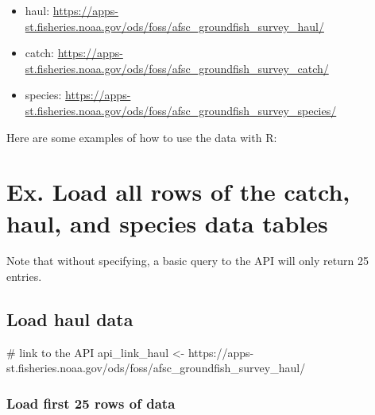\documentclass[
  letterpaper,
  oneside,
  open=any]{scrbook}
\newenvironment{Shaded}{\begin{snugshade}}{\end{snugshade}}
\newcommand{\AttributeTok}[1]{\textcolor[rgb]{0.40,0.45,0.13}{#1}}
\newcommand{\CommentTok}[1]{\textcolor[rgb]{0.37,0.37,0.37}{#1}}
\newcommand{\DocumentationTok}[1]{\textcolor[rgb]{0.37,0.37,0.37}{\textit{#1}}}
\newcommand{\FunctionTok}[1]{\textcolor[rgb]{0.28,0.35,0.67}{#1}}
\newcommand{\NormalTok}[1]{\textcolor[rgb]{0.00,0.23,0.31}{#1}}
\newcommand{\OtherTok}[1]{\textcolor[rgb]{0.00,0.23,0.31}{#1}}
\newcommand{\SpecialCharTok}[1]{\textcolor[rgb]{0.37,0.37,0.37}{#1}}
\newcommand{\StringTok}[1]{\textcolor[rgb]{0.13,0.47,0.30}{#1}}
\providecommand{\tightlist}{%
  \setlength{\itemsep}{0pt}\setlength{\parskip}{0pt}}\usepackage{longtable,booktabs,array}
\begin{document}
\begin{itemize}
\tightlist
\item
  haul:
  \url{https://apps-st.fisheries.noaa.gov/ods/foss/afsc_groundfish_survey_haul/}
\item
  catch:
  \url{https://apps-st.fisheries.noaa.gov/ods/foss/afsc_groundfish_survey_catch/}
\item
  species:
  \url{https://apps-st.fisheries.noaa.gov/ods/foss/afsc_groundfish_survey_species/}
\end{itemize}

Here are some examples of how to use the data with R:

\section{Ex. Load all rows of the catch, haul, and species data
tables}\label{ex.-load-all-rows-of-the-catch-haul-and-species-data-tables}

Note that without specifying, a basic query to the API will only return
25 entries.

\subsection{Load haul data}\label{load-haul-data}

\begin{Shaded}
\begin{Highlighting}[]
\CommentTok{\# link to the API}
\NormalTok{api\_link\_haul }\OtherTok{\textless{}{-}} \StringTok{\textquotesingle{}https://apps{-}st.fisheries.noaa.gov/ods/foss/afsc\_groundfish\_survey\_haul/\textquotesingle{}}
\end{Highlighting}
\end{Shaded}

\subsubsection{Load first 25 rows of
data}\label{load-first-25-rows-of-data}

\begin{Shaded}
\end{Shaded}
\end{document}
